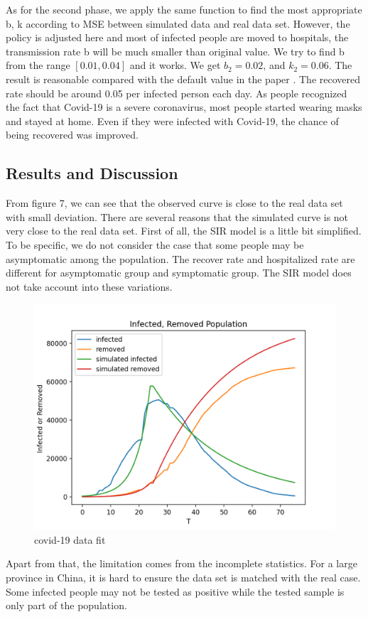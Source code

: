 \documentclass{article}
\begin{document}
As for the second phase, we apply the same function to find the most appropriate b, k according to MSE between simulated data and real data set. However, the policy is adjusted here and most of infected people are moved to hospitals, the transmission rate b will be much smaller than original value. We try to find b from the range $[0.01, 0.04]$ and it works. We get $b_{2}= 0.02$, and $k_{2} = 0.06$. The result is reasonable compared with the default value in the paper \cite{Cooper2020SIR}. The recovered rate should be around 0.05 per infected person each day. As people recognized the fact that Covid-19 is a severe coronavirus, most people started wearing masks and stayed at home. Even if they were infected with Covid-19, the chance of being recovered was improved. 





\subsection{Results and Discussion}

From figure 7, we can see that the observed curve is close to the real data set with small deviation. There are several reasons that the simulated curve is not very close to the real data set. First of all, the SIR model is a little bit simplified. To be specific, we do not consider the case that some people may be asymptomatic among the population. The recover rate and hospitalized rate are different for asymptomatic group and symptomatic group. The SIR model does not take account into these variations. 


\begin{figure}[htp]
\centering
\includegraphics[width=.4\textwidth]{covidsir4.png}
\caption{covid-19 data fit}
\label{fig:figure6}
\end{figure}



Apart from that, the limitation comes from the incomplete statistics. For a large province in China, it is hard to ensure the data set is matched with the real case. Some infected people may not be tested as positive while the tested sample is only part of the population.
\end{document}

